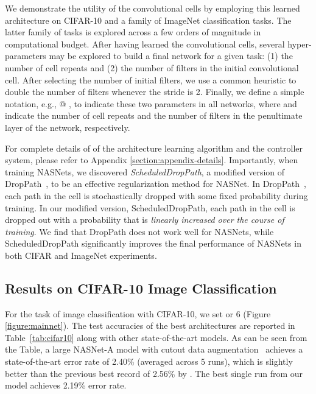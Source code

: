 We demonstrate the utility of the convolutional cells by employing this learned architecture on CIFAR-10 and a family of ImageNet classification tasks. The latter family of tasks is explored across a few orders of magnitude in computational budget.
After having learned the convolutional cells, several hyper-parameters may be explored to build a final network for a given task: (1) the number of cell repeats  and (2) the number of filters in the initial convolutional cell. After selecting the number of initial filters, we use a common heuristic to double the number of filters whenever the stride is 2.
Finally, we define a simple notation, e.g.,   @ , to indicate these two parameters in all networks, where  and  indicate the number of cell repeats and the number of filters in the penultimate layer of the network, respectively.

For complete details of of the architecture learning algorithm and the controller system, please refer to  Appendix \ref{section:appendix-details}. Importantly, when training NASNets, we discovered \emph{ScheduledDropPath}, a modified version of DropPath~\cite{larsson2016fractalnet}, to be an effective regularization method for NASNet. In DropPath~\cite{larsson2016fractalnet}, each path in the cell is stochastically dropped with some fixed probability during training.  In our modified version, ScheduledDropPath, each path in the cell is dropped out with a probability that is \emph{linearly increased over the course of training}. We find that DropPath does not work well for NASNets, while ScheduledDropPath  significantly improves the final performance of NASNets in both CIFAR and ImageNet experiments.

\subsection{Results on CIFAR-10 Image Classification}






For the task of image classification with CIFAR-10, we set  or 6 (Figure \ref{figure:mainnet}). The test accuracies of the best architectures are reported in Table~\ref{tab:cifar10} along with other state-of-the-art models. As can be seen from the Table, a large NASNet-A model with cutout data augmentation~\cite{devries2017improved} achieves a state-of-the-art error rate of 2.40\% (averaged across 5 runs), which is slightly better than the previous best record of 2.56\% by \cite{devries2017improved}. The best single run from our model achieves 2.19\% error rate.



